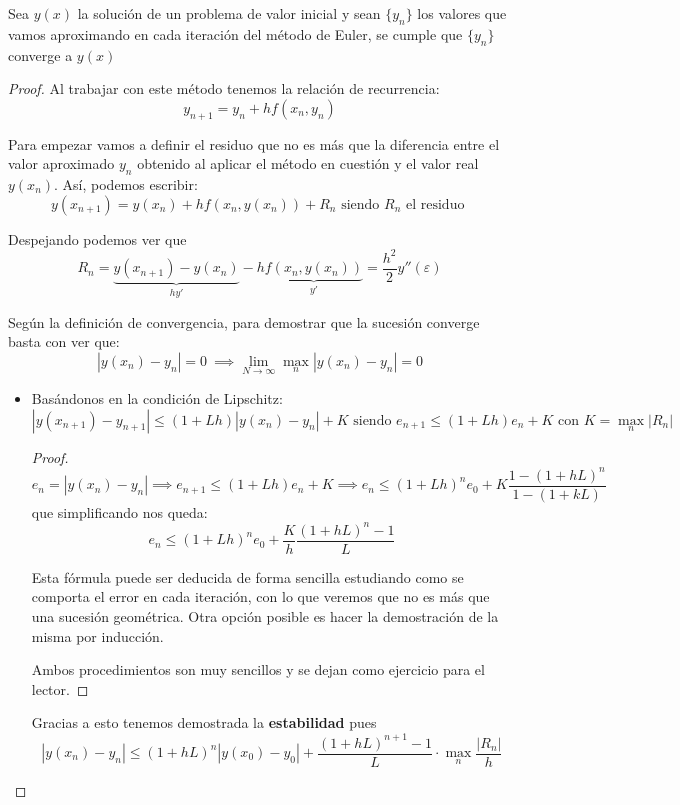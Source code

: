 \documentclass{apuntes}
\begin{document}
\begin{theorem}\label{theorem:EulerEsConvergente}

Sea $y(x)$ la solución de un problema de valor inicial y sean $\{y_n\}$ los valores que vamos aproximando en cada iteración del método de Euler, se cumple que $\{y_n\}$ converge a $y(x)$
\end{theorem}
\begin{proof}
Al trabajar con este método tenemos la relación de recurrencia:
\[y_{n+1} = y_n + h f(x_n, y_n)\]

Para empezar vamos a definir el residuo que no es más que la diferencia entre el valor aproximado $y_n$ obtenido al aplicar el método en cuestión y el valor real $y(x_n)$. Así, podemos escribir:
\[y(x_{n+1})=y(x_n)+hf(x_n,y(x_n))+R_n \text{ siendo } R_n \text{ el residuo }\]

Despejando podemos ver que
\[R_n = \underbrace{y(x_{n+1})-y(x_n)}_{hy'}-h\underbrace{f(x_n,y(x_n))}_{y'} = \frac{h^2}{2}y''(ε)\]


Según la definición de convergencia, para demostrar que la sucesión converge basta con ver que:
\[|y(x_n)-y_n | = 0 \ \implies \lim_{N \to \infty} \max_n |y(x_n)-y_n| = 0\]


\begin{itemize}
\item Basándonos en la condición de Lipschitz:
\[|y(x_{n+1})-y_{n+1}| \leq (1+Lh)|y(x_n)-y_n|+K \text{ siendo } e_{n+1} \leq (1+Lh)e_n + K \text{ con } K = \max_n |R_n|\]

\begin{proof}
\[e_n = |y(x_n)-y_n| \implies e_{n+1} \leq (1+Lh)e_n+K \implies e_n \leq (1+Lh)^n e_0 + K \frac{1-(1+hL)^n}{1-(1+kL)}\]
que simplificando nos queda:
\[e_n \leq (1+Lh)^n e_0 + \frac{K}{h}\frac{(1+hL)^n-1}{L}\]

Esta fórmula puede ser deducida de forma sencilla estudiando como se comporta el error en cada iteración, con lo que veremos que no es más que una sucesión geométrica. Otra opción posible es hacer la demostración de la misma por inducción.

Ambos procedimientos son muy sencillos y se dejan como ejercicio para el lector.
\end{proof}

Gracias a esto tenemos demostrada la \textbf{estabilidad} pues
\[|y(x_n)-y_n| \leq (1+hL)^n |y(x_0)-y_0| + \frac{(1+hL)^{n+1}-1}{L}\cdot \max_n \frac{|R_n|}{h}\]
%



\end{itemize}
\end{proof}
\end{document}
